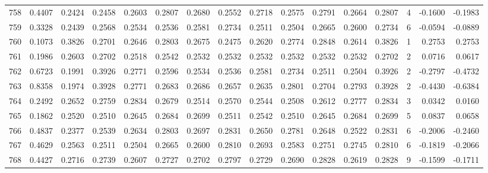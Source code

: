 \begin{tabular}{lrrrrrrrrrrrrrrr}
758 &      0.4407 &  0.2424 &  0.2458 &  0.2603 &  0.2807 &  0.2680 &  0.2552 &  0.2718 &  0.2575 &  0.2791 &   0.2664 &     0.2807 &      4 &                   -0.1600 &                    -0.1983 \\
759 &      0.3328 &  0.2439 &  0.2568 &  0.2534 &  0.2536 &  0.2581 &  0.2734 &  0.2511 &  0.2504 &  0.2665 &   0.2600 &     0.2734 &      6 &                   -0.0594 &                    -0.0889 \\
760 &      0.1073 &  0.3826 &  0.2701 &  0.2646 &  0.2803 &  0.2675 &  0.2475 &  0.2620 &  0.2774 &  0.2848 &   0.2614 &     0.3826 &      1 &                    0.2753 &                     0.2753 \\
761 &      0.1986 &  0.2603 &  0.2702 &  0.2518 &  0.2542 &  0.2532 &  0.2532 &  0.2532 &  0.2532 &  0.2532 &   0.2532 &     0.2702 &      2 &                    0.0716 &                     0.0617 \\
762 &      0.6723 &  0.1991 &  0.3926 &  0.2771 &  0.2596 &  0.2534 &  0.2536 &  0.2581 &  0.2734 &  0.2511 &   0.2504 &     0.3926 &      2 &                   -0.2797 &                    -0.4732 \\
763 &      0.8358 &  0.1974 &  0.3928 &  0.2771 &  0.2683 &  0.2686 &  0.2657 &  0.2635 &  0.2801 &  0.2704 &   0.2793 &     0.3928 &      2 &                   -0.4430 &                    -0.6384 \\
764 &      0.2492 &  0.2652 &  0.2759 &  0.2834 &  0.2679 &  0.2514 &  0.2570 &  0.2544 &  0.2508 &  0.2612 &   0.2777 &     0.2834 &      3 &                    0.0342 &                     0.0160 \\
765 &      0.1862 &  0.2520 &  0.2510 &  0.2645 &  0.2684 &  0.2699 &  0.2511 &  0.2542 &  0.2510 &  0.2645 &   0.2684 &     0.2699 &      5 &                    0.0837 &                     0.0658 \\
766 &      0.4837 &  0.2377 &  0.2539 &  0.2634 &  0.2803 &  0.2697 &  0.2831 &  0.2650 &  0.2781 &  0.2648 &   0.2522 &     0.2831 &      6 &                   -0.2006 &                    -0.2460 \\
767 &      0.4629 &  0.2563 &  0.2511 &  0.2504 &  0.2665 &  0.2600 &  0.2810 &  0.2693 &  0.2583 &  0.2751 &   0.2745 &     0.2810 &      6 &                   -0.1819 &                    -0.2066 \\
768 &      0.4427 &  0.2716 &  0.2739 &  0.2607 &  0.2727 &  0.2702 &  0.2797 &  0.2729 &  0.2690 &  0.2828 &   0.2619 &     0.2828 &      9 &                   -0.1599 &                    -0.1711 \\

\end{tabular}
